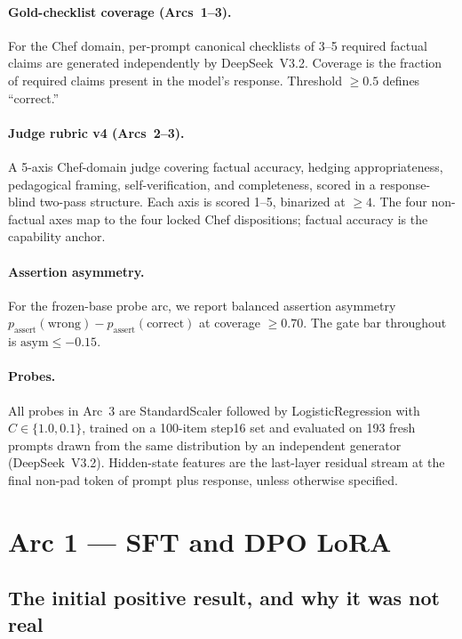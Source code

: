\documentclass[11pt,a4paper]{article}
\begin{document}
\paragraph{Gold-checklist coverage (Arcs~1--3).} For the Chef domain, per-prompt canonical checklists of 3--5 required factual claims are generated independently by DeepSeek~V3.2. Coverage is the fraction of required claims present in the model's response. Threshold $\geq 0.5$ defines ``correct.''

\paragraph{Judge rubric v4 (Arcs~2--3).} A 5-axis Chef-domain judge covering factual accuracy, hedging appropriateness, pedagogical framing, self-verification, and completeness, scored in a response-blind two-pass structure. Each axis is scored 1--5, binarized at $\geq 4$. The four non-factual axes map to the four locked Chef dispositions; factual accuracy is the capability anchor.

\paragraph{Assertion asymmetry.} For the frozen-base probe arc, we report balanced assertion asymmetry $p_{\text{assert}}(\text{wrong}) - p_{\text{assert}}(\text{correct})$ at coverage $\geq 0.70$. The gate bar throughout is $\text{asym} \leq -0.15$.

\paragraph{Probes.} All probes in Arc~3 are StandardScaler followed by LogisticRegression with $C \in \{1.0, 0.1\}$, trained on a 100-item step16 set and evaluated on 193 fresh prompts drawn from the same distribution by an independent generator (DeepSeek~V3.2). Hidden-state features are the last-layer residual stream at the final non-pad token of prompt plus response, unless otherwise specified.

\section{Arc 1 --- SFT and DPO LoRA}
\label{sec:arc1}

\subsection{The initial positive result, and why it was not real}
\end{document}

